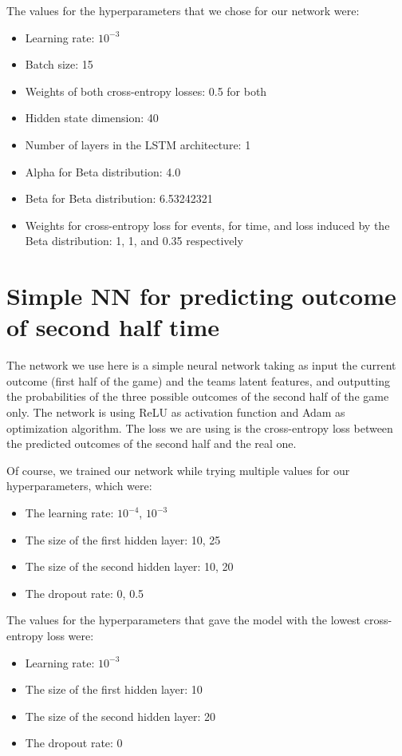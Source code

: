 \documentclass[10pt,conference,onecolumn]{IEEEtran}
\begin{document}
\begin{appendices}
The values for the hyperparameters that we chose for our network were:
\begin{itemize}
  \item Learning rate: $10^{-3}$
  \item Batch size: 15
  \item Weights of both cross-entropy losses: 0.5 for both
  \item Hidden state dimension: 40
  \item Number of layers in the LSTM architecture: 1
  \item Alpha for Beta distribution: 4.0
  \item Beta for Beta distribution: 6.53242321
  \item Weights for cross-entropy loss for events, for time, and loss induced by the Beta distribution: 1, 1, and 0.35 respectively
\end{itemize}

\section{Simple NN for predicting outcome of second half time}
\label{appendix:half_nn}
The network we use here is a simple neural network taking as input the current outcome (first half of the game) and the teams latent features, and outputting the probabilities of the three possible outcomes of the second half of the game only. The network is using ReLU \cite{relu} as activation function and Adam \cite{DBLP:journals/corr/KingmaB14} as optimization algorithm. The loss we are using is the cross-entropy loss between the predicted outcomes of the second half and the real one.

Of course, we trained our network while trying multiple values for our hyperparameters, which were:
\begin{itemize}
  \item The learning rate: $10^{-4}$, $10^{-3}$
  \item The size of the first hidden layer: 10, 25
  \item The size of the second hidden layer: 10, 20
  \item The dropout rate: 0, 0.5
\end{itemize}

The values for the hyperparameters that gave the model with the lowest cross-entropy loss were:
\begin{itemize}
  \item Learning rate: $10^{-3}$
  \item The size of the first hidden layer: 10
  \item The size of the second hidden layer: 20
  \item The dropout rate: 0
\end{itemize}


\end{appendices}
\end{document}
